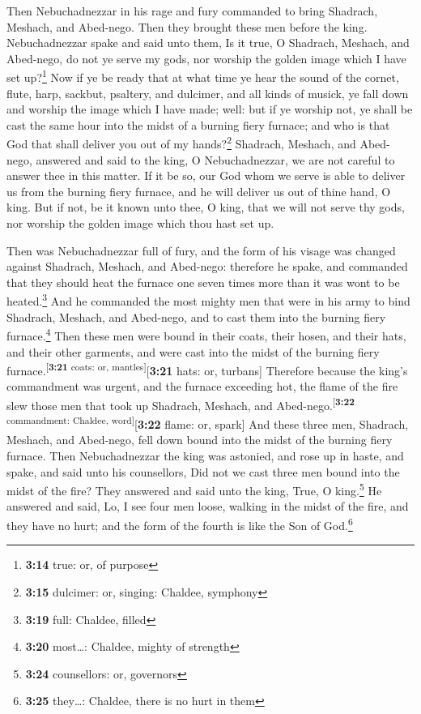 Then Nebuchadnezzar in his rage and fury commanded to
bring Shadrach, Meshach, and Abed-nego. Then they brought these men
before the king.  Nebuchadnezzar spake and said unto
them, Is it true, O Shadrach, Meshach, and Abed-nego, do not ye serve my
gods, nor worship the golden image which I have set up?\footnote{\textbf{3:14}
  true: or, of purpose}  Now if ye be ready that at what
time ye hear the sound of the cornet, flute, harp, sackbut, psaltery,
and dulcimer, and all kinds of musick, ye fall down and worship the
image which I have made; well: but if ye worship not, ye shall be cast
the same hour into the midst of a burning fiery furnace; and who is that
God that shall deliver you out of my hands?\footnote{\textbf{3:15}
  dulcimer: or, singing: Chaldee, symphony}  Shadrach,
Meshach, and Abed-nego, answered and said to the king, O Nebuchadnezzar,
we are not careful to answer thee in this matter.  If it
be so, our God whom we serve is able to deliver us from the burning
fiery furnace, and he will deliver us out of thine hand, O king.
 But if not, be it known unto thee, O king, that we will
not serve thy gods, nor worship the golden image which thou hast set up.

 Then was Nebuchadnezzar full of fury, and the form of
his visage was changed against Shadrach, Meshach, and Abed-nego:
therefore he spake, and commanded that they should heat the furnace one
seven times more than it was wont to be heated.\footnote{\textbf{3:19}
  full: Chaldee, filled}  And he commanded the most
mighty men that were in his army to bind Shadrach, Meshach, and
Abed-nego, and to cast them into the burning fiery furnace.\footnote{\textbf{3:20}
  most\ldots: Chaldee, mighty of strength}  Then these
men were bound in their coats, their hosen, and their hats, and their
other garments, and were cast into the midst of the burning fiery
furnace.\textsuperscript{{[}\textbf{3:21} coats: or,
mantles{]}}{[}\textbf{3:21} hats: or, turbans{]} 
Therefore because the king's commandment was urgent, and the furnace
exceeding hot, the flame of the fire slew those men that took up
Shadrach, Meshach, and Abed-nego.\textsuperscript{{[}\textbf{3:22}
commandment: Chaldee, word{]}}{[}\textbf{3:22} flame: or, spark{]}
 And these three men, Shadrach, Meshach, and Abed-nego,
fell down bound into the midst of the burning fiery furnace.
 Then Nebuchadnezzar the king was astonied, and rose up
in haste, and spake, and said unto his counsellors, Did not we cast
three men bound into the midst of the fire? They answered and said unto
the king, True, O king.\footnote{\textbf{3:24} counsellors: or,
  governors}  He answered and said, Lo, I see four men
loose, walking in the midst of the fire, and they have no hurt; and the
form of the fourth is like the Son of God.\footnote{\textbf{3:25}
  they\ldots: Chaldee, there is no hurt in them}

